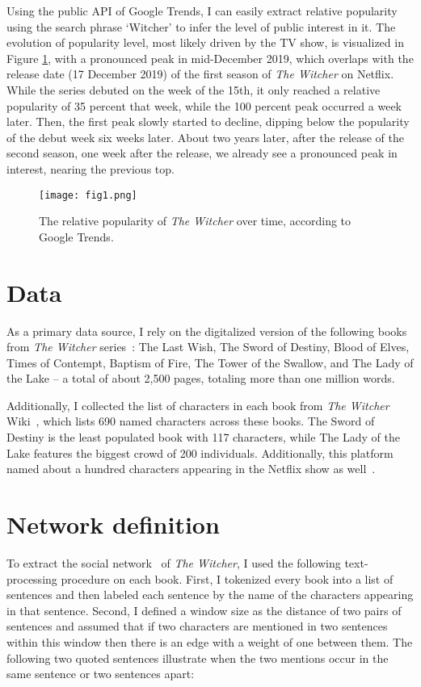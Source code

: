 \documentclass[fleqn,12pt]{wlscirep}
\begin{document}
Using the public API of Google Trends, I can easily extract relative popularity using the search phrase ‘Witcher’ to infer the level of public interest in it. The evolution of popularity level, most likely driven by the TV show, is visualized in Figure \ref{fig:fig1}, with a pronounced peak in mid-December 2019, which overlaps with the release date (17 December 2019) of the first season of {\it The Witcher} on Netflix. While the series debuted on the week of the 15th, it only reached a relative popularity of 35 percent that week, while the 100 percent peak occurred a week later. Then, the first peak slowly started to decline, dipping below the popularity of the debut week six weeks later. About two years later, after the release of the second season, one week after the release, we already see a pronounced peak in interest, nearing the previous top.


\begin{figure}[!hbt]
\centering
\texttt{[image: fig1.png]}
\caption{The relative popularity of {\it The Witcher} over time, according to Google Trends.}
\label{fig:fig1}
\end{figure}



\section{Data}


As a primary data source, I rely on the digitalized version of the following books from {\it The Witcher} series~\cite{books_w}: The Last Wish, The Sword of Destiny, Blood of Elves, Times of Contempt, Baptism of Fire, The Tower of the Swallow, and The Lady of the Lake – a total of about 2,500 pages, totaling more than one million words.

Additionally, I collected the list of characters in each book from {\it The Witcher} Wiki~\cite{wiki}, which lists 690 named characters across these books. The Sword of Destiny is the least populated book with 117 characters, while The Lady of the Lake features the biggest crowd of 200 individuals. Additionally, this platform named about a hundred characters appearing in the Netflix show as well~\cite{wiki2}.


 
\section{Network definition}

To extract the social network~\cite{got1, got2, asimov1} of {\it The Witcher}, I used the following text-processing procedure on each book. First, I tokenized every book into a list of sentences and then labeled each sentence by the name of the characters appearing in that sentence. Second, I defined a window size as the distance of two pairs of sentences and assumed that if two characters are mentioned in two sentences within this window then there is an edge with a weight of one between them. The following two quoted sentences illustrate when the two mentions occur in the same sentence or two sentences apart:
\end{document}
